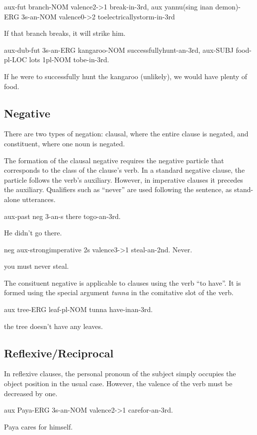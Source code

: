 aux-fut branch-NOM valence2->1 break-in-3rd, aux yannu(sing inan demon)-ERG
3s-an-NOM valence0->2 toelectricallystorm-in-3rd

If that branch breaks, it will strike him.

aux-dub-fut 3s-an-ERG kangaroo-NOM successfullyhunt-an-3rd, aux-SUBJ food-pl-LOC
lots 1pl-NOM tobe-in-3rd.

If he were to successfully hunt the kangaroo (unlikely), we would have plenty of
food.

\subsection{Negative}

There are two types of negation: clausal, where the entire clause is negated,
and constituent, where one noun is negated.

The formation of the clausal negative requires the negative particle that
corresponds to the class of the clause's verb. In a standard negative clause,
the particle follows the verb's auxiliary. However, in imperative clauses it
precedes the auxiliary. Qualifiers such as ``never'' are used following the
sentence, as stand-alone utterances.

aux-past neg 3-an-s there togo-an-3rd.

He didn't go there.

neg aux-strongimperative 2s valence3->1 steal-an-2nd. Never.

you must never steal.

The consituent negative is applicable to clauses using the verb ``to have''. It is
formed using the special argument \textit{tunna} in the comitative slot of the verb.

aux tree-ERG leaf-pl-NOM tunna have-inan-3rd.

the tree doesn't have any leaves.

\subsection{Reflexive/Reciprocal}

In reflexive clauses, the personal pronoun of the subject simply occupies the
object position in the usual case. However, the valence of the verb must be
decreased by one.

aux Paya-ERG 3s-an-NOM valence2->1 carefor-an-3rd.

Paya cares for himself.

